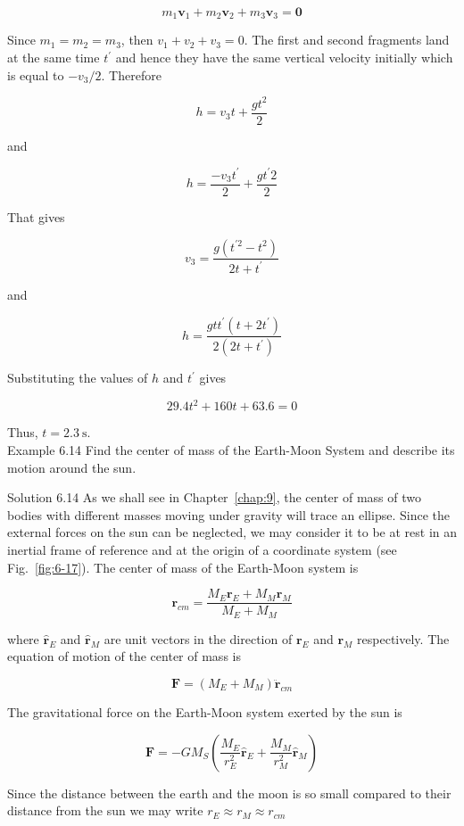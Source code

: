 \documentclass[10pt]{article}
\numberwithin{equation}{section}
\begin{document}
$$
m_{1} \mathbf{v}_{1}+m_{2} \mathbf{v}_{2}+m_{3} \mathbf{v}_{3}=\mathbf{0}
$$

Since $m_{1}=m_{2}=m_{3}$, then $v_{1}+v_{2}+v_{3}=0$. The first and second fragments land at the same time $t^{\prime}$ and hence they have the same vertical velocity initially which is equal to $-v_{3} / 2$. Therefore

$$
h=v_{3} t+\frac{g t^{2}}{2}
$$

and

$$
h=\frac{-v_{3} t^{\prime}}{2}+\frac{g t^{\prime} 2}{2}
$$

That gives

$$
v_{3}=\frac{g\left(t^{\prime 2}-t^{2}\right)}{2 t+t^{\prime}}
$$

and

$$
h=\frac{g t t^{\prime}\left(t+2 t^{\prime}\right)}{2\left(2 t+t^{\prime}\right)}
$$

Substituting the values of $h$ and $t^{\prime}$ gives

$$
29.4 t^{2}+160 t+63.6=0
$$

Thus, $t=2.3 \mathrm{~s}$.\\
Example 6.14 Find the center of mass of the Earth-Moon System and describe its motion around the sun.

Solution 6.14 As we shall see in Chapter~\ref{chap:9}, the center of mass of two bodies with different masses moving under gravity will trace an ellipse. Since the external forces on the sun can be neglected, we may consider it to be at rest in an inertial frame of reference and at the origin of a coordinate system (see Fig.~\ref{fig:6-17}). The center of mass of the Earth-Moon system is

$$
\mathbf{r}_{c m}=\frac{M_{E} \mathbf{r}_{E}+M_{M} \mathbf{r}_{M}}{M_{E}+M_{M}}
$$

where $\hat{\mathbf{r}}_{E}$ and $\hat{\mathbf{r}}_{M}$ are unit vectors in the direction of $\mathbf{r}_{E}$ and $\mathbf{r}_{M}$ respectively. The equation of motion of the center of mass is

$$
\mathbf{F}=\left(M_{E}+M_{M}\right) \ddot{\mathbf{r}}_{c m}
$$

The gravitational force on the Earth-Moon system exerted by the sun is

$$
\mathbf{F}=-G M_{S}\left(\frac{M_{E}}{r_{E}^{2}} \hat{\mathbf{r}}_{E}+\frac{M_{M}}{r_{M}^{2}} \hat{\mathbf{r}}_{M}\right)
$$

Since the distance between the earth and the moon is so small compared to their distance from the sun we may write $r_{E} \approx r_{M} \approx r_{c m}$
\end{document}
